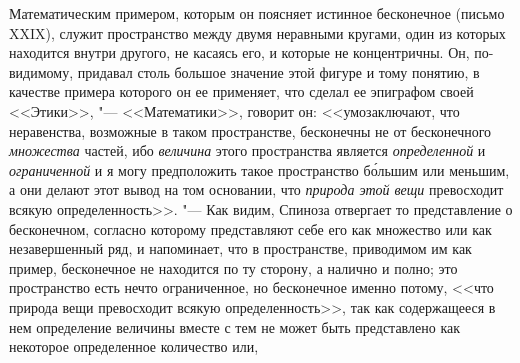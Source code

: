 Математическим примером, которым он поясняет истинное бесконечное (письмо
XXIX), служит пространство между двумя неравными кругами, один из которых
находится внутри другого, не касаясь его, и которые не концентричны. Он,
по-видимому, придавал столь большое значение этой фигуре и тому понятию, в
качестве примера которого он ее применяет, что сделал ее эпиграфом своей
<<Этики>>, "--- <<Математики>>, говорит он:
<<умозаключают, что неравенства, возможные в таком пространстве, бесконечны
не от бесконечного {\em множества} частей, ибо
{\em величина} этого пространства является {\em определенной} и
{\em ограниченной} и я могу предположить такое
пространство б\'{о}льшим или меньшим, а они делают этот вывод на том основании,
что {\em природа этой вещи} превосходит всякую
определенность>>. "--- Как видим, Спиноза
отвергает то представление о бесконечном, согласно которому представляют
себе его как множество или как незавершенный ряд, и напоминает, что в
пространстве, приводимом им как пример, бесконечное не находится по ту
сторону, а налично и полно; это пространство есть нечто ограниченное, но
бесконечное именно потому, <<что природа вещи превосходит всякую
определенность>>, так как содержащееся в нем определение величины вместе с
тем не может быть представлено как некоторое определенное количество или,
